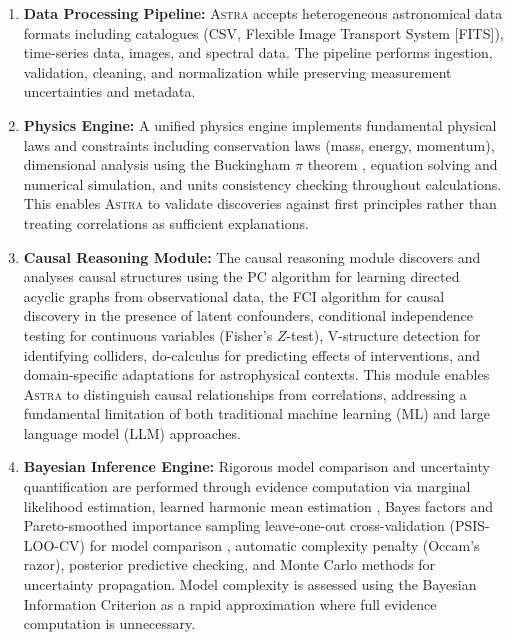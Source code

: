 \documentclass[usenatbib]{rasti}
\newcommand{\astra}{\textsc{Astra}\xspace}
\newcommand{\pc}{PC\xspace}
\newcommand{\fci}{FCI\xspace}
\begin{document}
\begin{enumerate}
  \item \textbf{Data Processing Pipeline:}
  \astra accepts heterogeneous astronomical data formats including catalogues (CSV, Flexible Image Transport System [FITS]), time-series data, images, and spectral data.
  The pipeline performs ingestion, validation, cleaning, and normalization while preserving measurement uncertainties and metadata.

  \item \textbf{Physics Engine:}
  A unified physics engine implements fundamental physical laws and constraints including conservation laws (mass, energy, momentum), dimensional analysis using the Buckingham $\pi$ theorem \citep{Buckingham1914}, equation solving and numerical simulation, and units consistency checking throughout calculations.
  This enables \astra to validate discoveries against first principles rather than treating correlations as sufficient explanations.

  \item \textbf{Causal Reasoning Module:}
  The causal reasoning module discovers and analyses causal structures using the \pc algorithm \citep{Spirtes2000} for learning directed acyclic graphs from observational data, the \fci algorithm \citep{Zhang2008} for causal discovery in the presence of latent confounders, conditional independence testing for continuous variables (Fisher's $Z$-test), V-structure detection for identifying colliders, do-calculus \citep{Pearl2009} for predicting effects of interventions, and domain-specific adaptations for astrophysical contexts.
  This module enables \astra to distinguish causal relationships from correlations, addressing a fundamental limitation of both traditional machine learning (ML) and large language model (LLM) approaches.

  \item \textbf{Bayesian Inference Engine:}
  Rigorous model comparison and uncertainty quantification are performed through evidence computation via marginal likelihood estimation, learned harmonic mean estimation \citep{SpurioMancini+2023}, Bayes factors and Pareto-smoothed importance sampling leave-one-out cross-validation (PSIS-LOO-CV) for model comparison \citep{Eadie+2023}, automatic complexity penalty (Occam's razor), posterior predictive checking, and Monte Carlo methods for uncertainty propagation.
  Model complexity is assessed using the Bayesian Information Criterion \citep[BIC;][]{Schwarz1978} as a rapid approximation where full evidence computation is unnecessary.


\end{enumerate}
\end{document}

